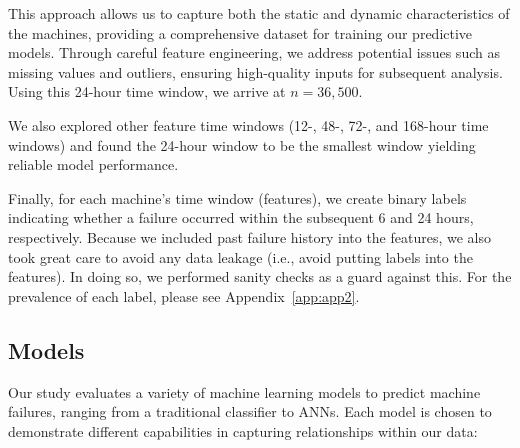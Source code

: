 \documentclass{article}
\begin{document}
This approach allows us to capture both the static and dynamic characteristics of the machines, providing a comprehensive dataset for training our predictive models. Through careful feature engineering, we address potential issues such as missing values and outliers, ensuring high-quality inputs for subsequent analysis. Using this 24-hour time window, we arrive at $n = 36,500$. 

We also explored other feature time windows (12-, 48-, 72-, and 168-hour time windows) and found the 24-hour window to be the smallest window yielding reliable model performance.

Finally, for each machine's time window (features), we create binary labels indicating whether a failure occurred within the subsequent 6 and 24 hours, respectively. Because we included past failure history into the features, we also took great care to avoid any data leakage (i.e., avoid putting labels into the features). In doing so, we performed sanity checks as a guard against this. For the prevalence of each label, please see Appendix~\ref{app:app2}.

\subsection{Models}

Our study evaluates a variety of machine learning models to predict machine failures, ranging from a traditional classifier to ANNs. Each model is chosen to demonstrate different capabilities in capturing relationships within our data:
\end{document}
